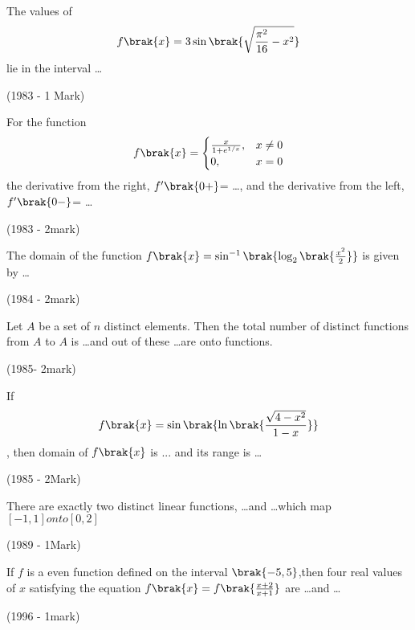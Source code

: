 \iffalse
\title{Assignment}
\author{M.Ranjith}
\section{fitb}
\fi
\item The values of \begin{align*}f\brak{x}=3\sin\brak{\sqrt{\frac{\pi^2}{16}-x^2}}\end{align*}lie in the interval \dots 
    
    
    \hfill{(1983 - 1 Mark)}
    
    
     \item For the function \begin{align*}f\brak{x} = \begin{cases} \frac{x}{1 + e^{1/x}}, & x \neq 0 \\ 0, & x = 0 \end{cases} \end{align*}
    the derivative from the right, $f^{\prime}\brak{0+} $= \dots , and the derivative from the left, $f^{\prime }\brak{0-}$= \dots
    
    
     
    \hfill{(1983 - 2mark)}
    
    \item{The domain of the function $f\brak{x}=\sin^{-1}\brak{\log_{2}\brak{\frac{x^{2}}{2}}}$ is given by \dots
    
    
    \hfill 
    {(1984 - 2mark)}
    
    \item Let $A$ be a set of $n$ distinct elements. Then the total number of distinct functions from $ A $ to $ A $ is \dots  and out of these \dots are onto functions.
    
    \hfill
    {(1985- 2mark)}
    
    
    \item If \begin{align*}  f\brak{x} = \sin \brak{ \ln \brak{ \frac{\sqrt{4 - x^{2}}}{1 - x}}} \end{align*},  then domain of  $f\brak{x}$ is ... and its range is \dots
    
    
    \hfill
    {(1985 - 2Mark)}
    
     
    \item There are exactly two distinct linear functions, \dots and \dots which map $[-1,1]onto [0,2]$
    
    \hfill
    {(1989 - 1Mark)}
    
    
    
     \item If $f$ is a even function defined on the 
    interval $\brak{-5,5}$,then four real values of $x $
    satisfying the equation $f\brak{x}=f\brak{{\frac{x+2}{x+1}}}$
    are \dots  and \dots 
    
    
    \hfill   (1996 - 1mark)
    }
